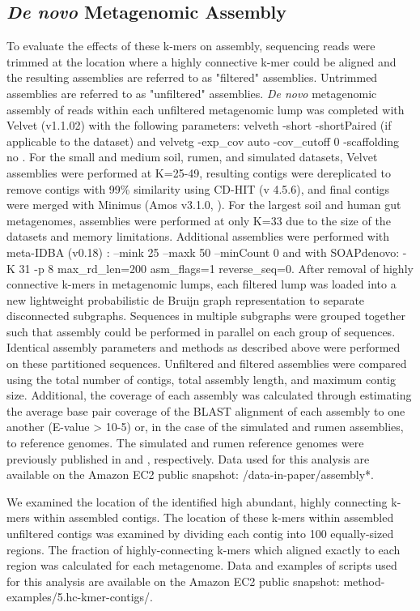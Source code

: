 \documentclass[10pt]{article}
\begin{document}
\subsection*{\emph{De novo} Metagenomic Assembly}

To evaluate the effects of these k-mers on assembly, sequencing reads were trimmed at the location where a highly connective k-mer could be aligned and the resulting assemblies are referred to as "filtered" assemblies.  Untrimmed assemblies are referred to as "unfiltered" assemblies.  \emph{De novo} metagenomic assembly of reads within each unfiltered metagenomic lump was completed with Velvet (v1.1.02) with the following parameters: velveth -short -shortPaired (if applicable to the dataset) and velvetg -exp\_cov auto -cov\_cutoff 0 -scaffolding no \cite{Zerbino:2008p665}.  For the small and medium soil, rumen, and simulated datasets, Velvet assemblies were performed at K=25-49, resulting contigs were dereplicated to remove contigs with 99\% similarity using CD-HIT (v 4.5.6), and final contigs were merged with Minimus (Amos v3.1.0, \cite{Sommer:2007p1253}).  For the largest soil and human gut metagenomes, assemblies were performed at only K=33 due to the size of the datasets and memory limitations.  Additional assemblies were performed with meta-IDBA (v0.18) \cite{Peng:2011p898} : --mink 25 --maxk 50 --minCount 0 and with SOAPdenovo:  -K 31 -p 8  max\_rd\_len=200 asm\_flags=1 reverse\_seq=0.  After removal of highly connective k-mers in metagenomic lumps, each filtered lump was loaded into a new lightweight probabilistic de Bruijn graph representation to separate disconnected subgraphs.  Sequences in multiple subgraphs were grouped together such that assembly could be performed in parallel on each group of sequences.  Identical assembly parameters and methods as described above were performed on these partitioned sequences.  Unfiltered and filtered assemblies were compared using the total number of contigs, total assembly length, and maximum contig size.  Additional, the coverage of each assembly was calculated through estimating the average base pair coverage of the BLAST alignment of each assembly to one another (E-value > 10-5) or, in the case of the simulated and rumen assemblies, to reference genomes.  The simulated and rumen reference genomes were previously published in \cite{Hess:2011p686} and \cite{Pignatelli:2011p742}, respectively.  Data used for this analysis are available on the Amazon EC2 public snapshot: /data-in-paper/assembly*.

We examined the location of the identified high abundant, highly connecting k-mers within assembled contigs.  The location of these k-mers within assembled unfiltered contigs was examined by dividing each contig into 100 equally-sized regions.  The fraction of highly-connecting k-mers which aligned exactly to each region was calculated for each metagenome. Data and examples of scripts used for this analysis are available on the Amazon EC2 public snapshot: method-examples/5.hc-kmer-contigs/.
\end{document}
